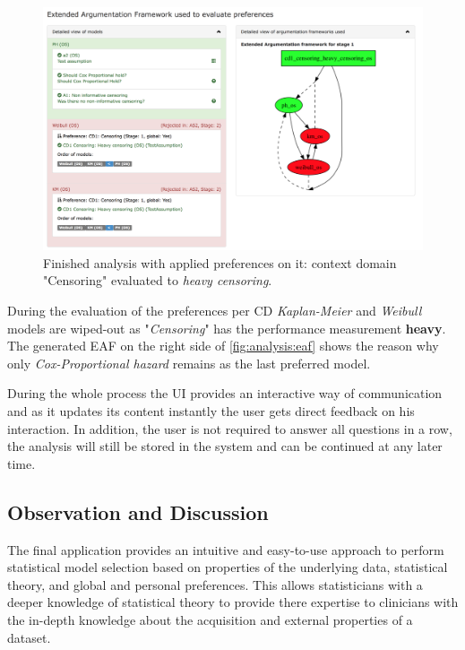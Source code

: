 \begin{figure}[t]
	\centering
	\includegraphics[width=\textwidth]{figures/ui_analysis_eaf}
	\caption{Finished analysis with applied preferences on it: context domain "Censoring" evaluated to \textit{heavy censoring}. }
	\label{fig:analysis:eaf}
\end{figure}


During the evaluation of the preferences per \gls{CD} \textit{Kaplan-Meier} and \textit{Weibull} models are wiped-out as "\textit{Censoring}" has the performance measurement \textbf{heavy}. The generated \gls{EAF} on the right side of \autoref{fig:analysis:eaf} shows the reason why only \textit{Cox-Proportional hazard} remains as the last preferred model.


During the whole process the \gls{UI} provides an interactive way of communication and as it updates its content instantly the user gets direct feedback on his interaction. In addition, the user is not required to answer all questions in a row, the analysis will still be stored in the system and can be continued at any later time. 





\subsection{Observation and Discussion}

The final application provides an intuitive and easy-to-use approach to perform statistical model selection based on properties of the underlying data, statistical theory, and global and personal preferences. This allows statisticians with a deeper knowledge of statistical theory to provide there expertise to clinicians with the in-depth knowledge about the acquisition and external properties of a dataset. 

